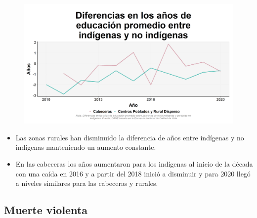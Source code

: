     \begin{figure}[H]
        \caption[Diferencia en los años de educación promedio entre indígenas y no indígenas por zonas ]{\label{difeducmin_zona_trend} }
        \begin{center}
        \includegraphics[width=\textwidth,keepaspectratio]{img/var_124_trend.png}
        \end{center}
    \end{figure}
            \begin{itemize}
                \item Las zonas rurales han disminuido la diferencia de años entre indígenas y no indígenas manteniendo un aumento constante.
                \item En las cabeceras los años aumentaron para los indígenas al inicio de la década con una caída en 2016 y a partir del 2018 inició a disminuir y para 2020 llegó a niveles similares para las cabeceras y rurales.
                \end{itemize}

    \subsection{Muerte violenta}


